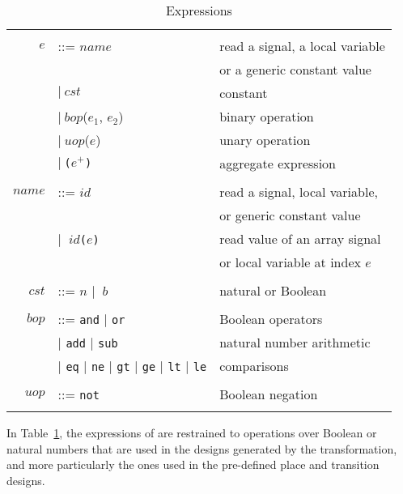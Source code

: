 \begin{table}[!t]
  \caption{Expressions}
  \label{tab:expr}
  \begin{tabular}{|rll|}
    \hline
    & & \\
    $e$ & ::= $name$ & read a signal, a local variable \\
    & & or a generic constant value \\
    & \quad $\vert{}~cst$ & constant \\
    & \quad $\vert{}~bop$($e_1$, $e_2$) & binary operation \\
    & \quad $\vert{}~uop$($e$) & unary operation \\
    & \quad $\vert{}~$\texttt{(}$e^{+}$\texttt{)} & aggregate expression \\
    & & \\
    $name$ & ::= $id$ & read a signal, local variable, \\
    & & or generic constant value \\
    & \quad$\vert{}~$ $id$\texttt{(}$e$\texttt{)} & read value of an array signal  \\
    & & or local variable at index $e$ \\
    & & \\
    $cst$ & ::= $n$ $\vert{}~$ $b$ & natural or Boolean \\
    & & \\
    $bop$ & ::= \texttt{and} $\vert{}$ \texttt{or} & Boolean operators \\
    & \quad$\vert{}$ \texttt{add} $\vert{}$ \texttt{sub} & natural number arithmetic \\
    & \quad$\vert{}$ \texttt{eq} $\vert{}$ \texttt{ne} $\vert{}$ \texttt{gt} $\vert{}$ \texttt{ge} $\vert{}$ \texttt{lt} $\vert{}$ \texttt{le} & comparisons \\
    & & \\
    $uop$ & ::= \texttt{not} & Boolean negation \\
    & & \\
    \hline
  \end{tabular}
\end{table}

In Table~\ref{tab:expr}, the expressions of \hvhdl{} are restrained to
operations over Boolean or natural numbers that are used in the
designs generated by the transformation, and more particularly the
ones used in the pre-defined place and transition designs.


